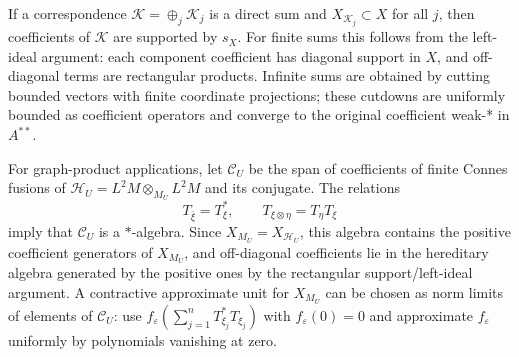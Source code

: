 \documentclass{article}
\begin{document}
If a correspondence \(\mathcal K=\oplus_j \mathcal K_j\) is a direct sum and
\(X_{\mathcal K_j}\subset X\) for all \(j\), then coefficients of \(\mathcal K\)
are supported by \(s_X\).  For finite sums this follows from the left-ideal
argument: each component coefficient has diagonal support in \(X\), and
off-diagonal terms are rectangular products.  Infinite sums are obtained by
cutting bounded vectors with finite coordinate projections; these cutdowns are
uniformly bounded as coefficient operators and converge to the original
coefficient weak-* in \(A^{**}\).

For graph-product applications, let \(\mathcal C_U\) be the span of coefficients
of finite Connes fusions of \(\mathcal H_U=L^2M\otimes_{M_U}L^2M\) and its
conjugate.  The relations
\[
        T_{\bar\xi}=T_\xi^*,\qquad T_{\xi\otimes\eta}=T_\eta T_\xi
\]
imply that \(\mathcal C_U\) is a \(*\)-algebra.  Since \(X_{M_U}=X_{\mathcal
H_U}\), this algebra contains the positive coefficient generators of
\(X_{M_U}\), and off-diagonal coefficients lie in the hereditary algebra
generated by the positive ones by the rectangular support/left-ideal argument.
A contractive approximate unit for \(X_{M_U}\) can be chosen as
norm limits of elements of \(\mathcal C_U\): use
\(f_\varepsilon(\sum_{j=1}^n T_{\xi_j}^*T_{\xi_j})\) with
\(f_\varepsilon(0)=0\) and approximate \(f_\varepsilon\) uniformly by
polynomials vanishing at zero.
\end{document}
